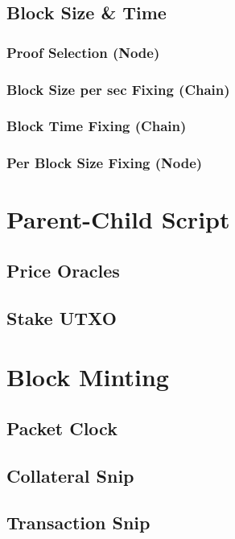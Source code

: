 \documentclass[a4paper,11pt]{article}
\begin{document}
\subsection{Block Size \& Time}

\subsubsection{Proof Selection (Node)}
\subsubsection{Block Size per sec Fixing (Chain)}
\subsubsection{Block Time Fixing (Chain)}
\subsubsection{Per Block Size Fixing (Node)}

\section{Parent-Child Script}

\subsection{Price Oracles}

\subsection{Stake UTXO}

\section{Block Minting}

\subsection{Packet Clock}

\subsection{Collateral Snip}

\subsection{Transaction Snip}
\end{document}
